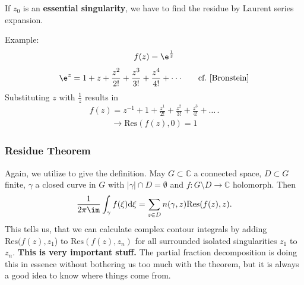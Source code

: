 \noindent If $z_0$ is an \textbf{essential singularity}, we have to find the residue by
Laurent series expansion.

\noindent Example:
\begin{align}
	f(z)=\e^{\frac{1}{z}} \nonumber
\end{align}
\begin{align}
	\e^z=1+z+\frac{z^2}{2!}+\frac{z^3}{3!}+\frac{z^4}{4!}+\cdot\cdot\cdot\quad\quad \textrm{cf.~\cite{Bronstein}} \nonumber
\end{align}
Substituting $z$ with $\frac{1}{z}$ results in
\begin{align}
	f(z)=z^{-1}+1+\frac{z^1}{2!}+\frac{z^2}{3!}+\frac{z^3}{4!}+\dots\,. \nonumber
\end{align}
\begin{align}
	\rightarrow\mathrm{Res}(f(z),0)=1 \nonumber
\end{align}
\subsubsection{Residue Theorem}
Again, we utilize \cite{Fritzsche2019} to give the definition.
May $G \subset \mathbb{C}$ a connected space, $D \subset G$ finite, $\gamma$ a closed curve in $G$ with $|\gamma| \cap D = \emptyset$ and $f: G \setminus D \rightarrow \mathbb{C}$ holomorph. Then
\begin{align}
	\frac{1}{2\pi\im}\int_{\gamma}f(\xi)\mathrm{d}\xi = \sum_{z\in D}n(\gamma,z)\mathrm{Res}(f(z),z).
\end{align}
This tells us, that we can calculate complex contour integrals
by adding $\mathrm{Res}(f(z),z_1$) to $\mathrm{Res}(f(z),z_n)$ for all
surrounded isolated singularities $z_1$ to $z_n$. \textbf{This is very important stuff.}
%
The partial fraction decomposition is doing this in essence without bothering
us too much with the theorem, but it is always a good idea to know where things
come from.

